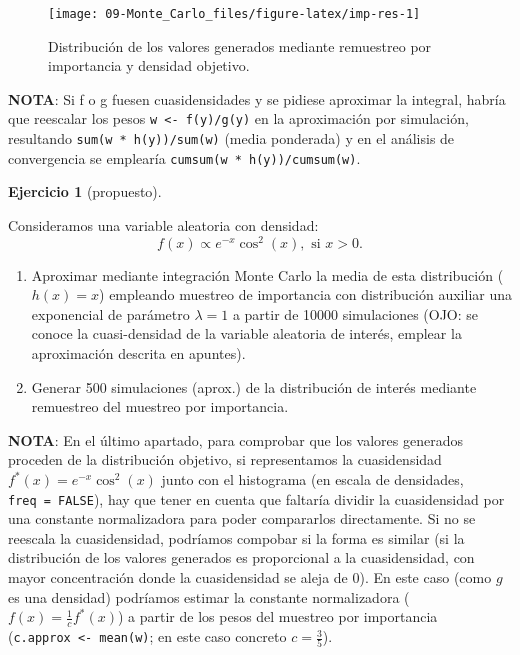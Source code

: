 \documentclass[
]{book}
\theoremstyle{break}
\theoremstyle{definition}
\theoremstyle{definition}
\theoremstyle{definition}
\newtheorem{exercise}{Ejercicio}[chapter]
\theoremstyle{definition}
\theoremstyle{remark}
\begin{document}
\begin{figure}[!htb]

{\centering \texttt{[image: 09-Monte\_Carlo\_files/figure-latex/imp-res-1]} 

}

\caption{Distribución de los valores generados mediante remuestreo por importancia y densidad objetivo.}\label{fig:imp-res}
\end{figure}

\textbf{NOTA}: Si f o g fuesen cuasidensidades y se pidiese aproximar la integral, habría que reescalar los pesos \texttt{w\ \textless{}-\ f(y)/g(y)} en la aproximación por simulación, resultando \texttt{sum(w\ *\ h(y))/sum(w)} (media ponderada) y en el análisis de convergencia se emplearía \texttt{cumsum(w\ *\ h(y))/cumsum(w)}.

\begin{exercise}[propuesto]
\protect\hypertarget{exr:mc-imp-sample2}{}{\label{exr:mc-imp-sample2} {} }
\end{exercise}

Consideramos una variable aleatoria con densidad:
\[f(x)\propto e^{-x}\cos^{2}(x),\text{ si }x>0.\]

\begin{enumerate}
\def\labelenumi{\alph{enumi}.}
\item
  Aproximar mediante integración Monte Carlo la media de esta
  distribución (\(h(x)=x\)) empleando muestreo de importancia con
  distribución auxiliar una exponencial de parámetro \(\lambda=1\) a
  partir de 10000 simulaciones (OJO: se conoce la cuasi-densidad
  de la variable aleatoria de interés, emplear la aproximación descrita
  en apuntes).
\item
  Generar 500 simulaciones (aprox.) de la distribución de interés
  mediante remuestreo del muestreo por importancia.
\end{enumerate}

\textbf{NOTA}: En el último apartado, para comprobar que los valores generados proceden de la distribución objetivo, si representamos la cuasidensidad \(f^{\ast}(x) = e^{-x}\cos^{2}(x)\) junto con el histograma (en escala de densidades, \texttt{freq\ =\ FALSE}), hay que tener en cuenta que faltaría dividir la cuasidensidad por una constante normalizadora para poder compararlos directamente.
Si no se reescala la cuasidensidad, podríamos compobar si la forma es similar (si la distribución de los valores generados es proporcional a la cuasidensidad, con mayor concentración donde la cuasidensidad se aleja de 0).
En este caso (como \(g\) es una densidad) podríamos estimar la constante normalizadora (\(f(x) = \frac{1}{c}f^{\ast}(x)\)) a partir de los pesos del muestreo por importancia (\texttt{c.approx\ \textless{}-\ mean(w)}; en este caso concreto \(c=\frac{3}{5}\)).
\end{document}
